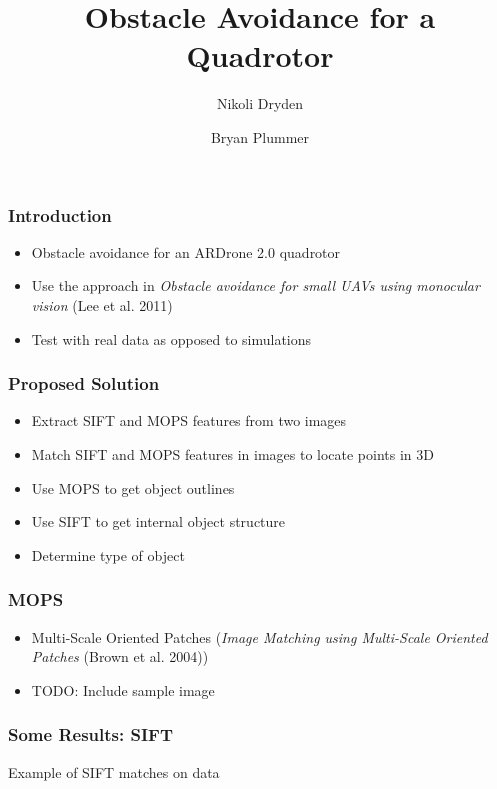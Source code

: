 \documentclass[xcolor=x11names,compress,t]{beamer}
\renewcommand{\(}{\begin{columns}}
\renewcommand{\)}{\end{columns}}
\newcommand{\<}[1]{\begin{column}{#1}}
\renewcommand{\>}{\end{column}}
\begin{document}
\abovedisplayskip=6pt

%
%

\begin{frame}
\title{Obstacle Avoidance for a Quadrotor}
\author{Nikoli Dryden \and Bryan Plummer}
\date{}
\titlepage
\end{frame}


\begin{frame}
  \frametitle{Introduction}
  \begin{itemize}
  \item Obstacle avoidance for an ARDrone 2.0 quadrotor
  \item Use the approach in \emph{Obstacle avoidance for small UAVs using monocular vision} (Lee et al. 2011)
  \item Test with real data as opposed to simulations
  \end{itemize}
\end{frame}

\begin{frame}
  \frametitle{Proposed Solution}
  \begin{itemize}
  \item Extract SIFT and MOPS features from two images
  \item Match SIFT and MOPS features in images to locate points in 3D
  \item Use MOPS to get object outlines
  \item Use SIFT to get internal object structure
  \item Determine type of object
  \end{itemize}
\end{frame}

\begin{frame}
  \frametitle{MOPS}
  \begin{itemize}
  \item Multi-Scale Oriented Patches (\emph{Image Matching using Multi-Scale Oriented Patches} (Brown et al. 2004))
  \item TODO: Include sample image
  \end{itemize}
\end{frame}

\begin{frame}
  \frametitle{Some Results: SIFT}
  Example of SIFT matches on data
\end{frame}
\end{document}

